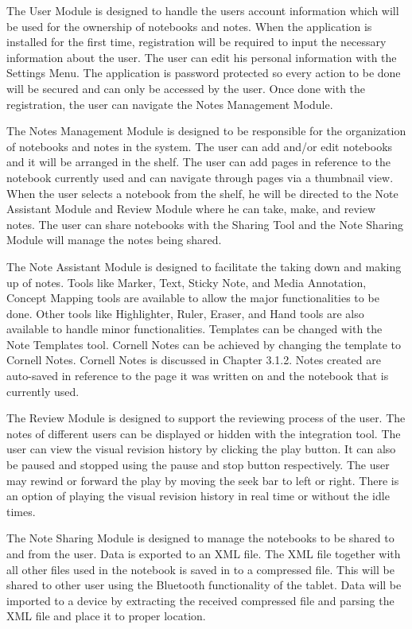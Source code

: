 The User Module is designed to handle the users account information which will be used for the ownership of notebooks and notes. When the application is installed for the first time, registration will be required to input the necessary information about the user. The user can edit his personal information with the Settings Menu. The application is password protected so every action to be done will be secured and can only be accessed by the user. Once done with the registration, the user can navigate the Notes Management Module.

The Notes Management Module is designed to be responsible for the organization of notebooks and notes in the system. The user can add and/or edit notebooks and it will be arranged in the shelf. The user can add pages in reference to the notebook currently used and can navigate through pages via a thumbnail view. When the user selects a notebook from the shelf, he will be directed to the Note Assistant Module and Review Module where he can take, make, and review notes. The user can share notebooks with the Sharing Tool and the Note Sharing Module will manage the notes being shared.

The Note Assistant Module is designed to facilitate the taking down and making up of notes. Tools like Marker, Text, Sticky Note, and Media Annotation, Concept Mapping tools are available to allow the major functionalities to be done. Other tools like Highlighter, Ruler, Eraser, and Hand tools are also available to handle minor functionalities. Templates can be changed with the Note Templates tool. Cornell Notes can be achieved by changing the template to Cornell Notes. Cornell Notes is discussed in Chapter 3.1.2. Notes created are auto-saved in reference to the page it was written on and the notebook that is currently used.

The Review Module is designed to support the reviewing process of the user. The notes of different users can be displayed or hidden with the integration tool. The user can view the visual revision history by clicking the play button. It can also be paused and stopped using the pause and stop button respectively. The user may rewind or forward the play by moving the seek bar to left or right. There is an option of playing the visual revision history in real time or without the idle times.

The Note Sharing Module is designed to manage the notebooks to be shared to and from the user. Data is exported to an XML file. The XML file together with all other files used in the notebook is saved in to a compressed file. This will be shared to other user using the Bluetooth functionality of the tablet. Data will be imported to a device by extracting the received compressed file and parsing the XML file and place it to proper location.

